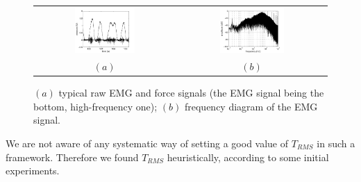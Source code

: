 \begin{figure}[!ht] \centering
  \begin{tabular}{cc}
    \includegraphics[width=0.45\textwidth]{figs/force_raw} &
    \includegraphics[width=0.45\textwidth]{figs/spectrum_raw} \\
    $(a)$ & $(b)$ \\
  \end{tabular}
  \caption{$(a)$ typical raw EMG and force signals (the EMG signal
    being the bottom, high-frequency one); $(b)$ frequency diagram of
    the EMG signal.}
  \label{fig:spectra}
\end{figure}


We are not aware of any systematic way of setting a good value of $T_{RMS}$ in such a framework. Therefore we found $T_{RMS}$ heuristically, according to some initial experiments.

